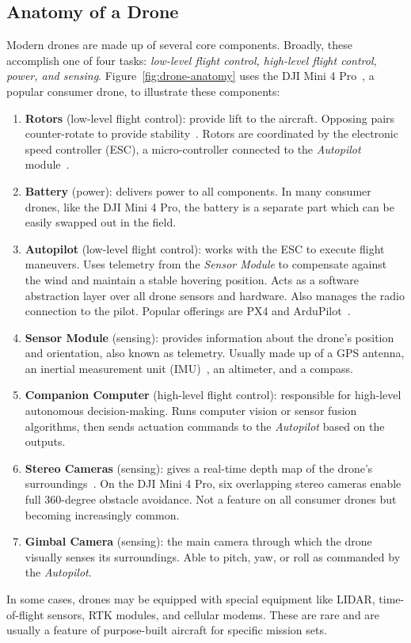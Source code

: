 \subsection{Anatomy of a Drone}
\label{sec:drone-anatomy}
Modern drones are made up of several core components. Broadly, these accomplish one of four tasks: \textit{low-level flight control, high-level flight control, power, and sensing}. Figure~\ref{fig:drone-anatomy} uses the DJI Mini 4 Pro~\cite{DJIMini4}, a popular consumer drone, to illustrate these components:

\begin{enumerate}
    \item \textbf{Rotors} (low-level flight control): provide lift to the aircraft. Opposing pairs counter-rotate to provide stability~\cite{Allain2017}. Rotors are coordinated by the electronic speed controller (ESC), a micro-controller connected to the \textit{Autopilot} module~\cite{Nagel2023}. \\
    \item \textbf{Battery} (power): delivers power to all components. In many consumer drones, like the DJI Mini 4 Pro, the battery is a separate part which can be easily swapped out in the field. \\
    \item \textbf{Autopilot} (low-level flight control): works with the ESC to execute flight maneuvers. Uses telemetry from the \textit{Sensor Module} to compensate against the wind and maintain a stable hovering position. Acts as a software abstraction layer over all drone sensors and hardware. Also manages the radio connection to the pilot. Popular offerings are PX4 and ArduPilot~\cite{PX4,Ardupilot}. \\
    \item \textbf{Sensor Module} (sensing): provides information about the drone's position and orientation, also known as telemetry. Usually made up of a GPS antenna, an inertial measurement unit (IMU)~\cite{IMU}, an altimeter, and a compass. \\
    \item \textbf{Companion Computer} (high-level flight control): responsible for high-level autonomous decision-making. Runs computer vision or sensor fusion algorithms, then sends actuation commands to the \textit{Autopilot} based on the outputs.
    \item \textbf{Stereo Cameras} (sensing): gives a real-time depth map of the drone's surroundings~\cite{Stereo}. On the DJI Mini 4 Pro, six overlapping stereo cameras enable full 360-degree obstacle avoidance. Not a feature on all consumer drones but becoming increasingly common. \\
    \item \textbf{Gimbal Camera} (sensing): the main camera through which the drone visually senses its surroundings. Able to pitch, yaw, or roll as commanded by the \textit{Autopilot}.
\end{enumerate}
In some cases, drones may be equipped with special equipment like LIDAR, time-of-flight sensors, RTK modules, and cellular modems. These are rare and are usually a feature of purpose-built aircraft for specific mission sets. 

